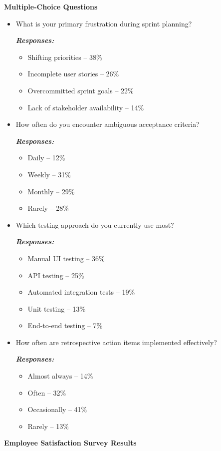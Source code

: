 \documentclass[12pt,a4paper,oneside]{book}
\begin{document}
\textbf{Multiple-Choice Questions}
\begin{itemize}
  \item What is your primary frustration during sprint planning?
  
   \textbf{\textit{Responses:}}
  \begin{itemize}
    \item Shifting priorities – 38\%
    \item Incomplete user stories – 26\%
    \item Overcommitted sprint goals – 22\%
    \item Lack of stakeholder availability – 14\%
  \end{itemize}

  \item How often do you encounter ambiguous acceptance criteria?
  
   \textbf{\textit{Responses:}}
  \begin{itemize}
    \item Daily – 12\%
    \item Weekly – 31\%
    \item Monthly – 29\%
    \item Rarely – 28\%
  \end{itemize}

  \item Which testing approach do you currently use most?
  
   \textbf{\textit{Responses:}}
  \begin{itemize}
    \item Manual UI testing – 36\%
    \item API testing – 25\%
    \item Automated integration tests – 19\%
    \item Unit testing – 13\%
    \item End-to-end testing – 7\%
  \end{itemize}

  \item How often are retrospective action items implemented effectively?
  
   \textbf{\textit{Responses:}}
  \begin{itemize}
    \item Almost always – 14\%
    \item Often – 32\%
    \item Occasionally – 41\%
    \item Rarely – 13\%
  \end{itemize}
\end{itemize}
\textbf{Employee Satisfaction Survey Results}\\
\end{document}

